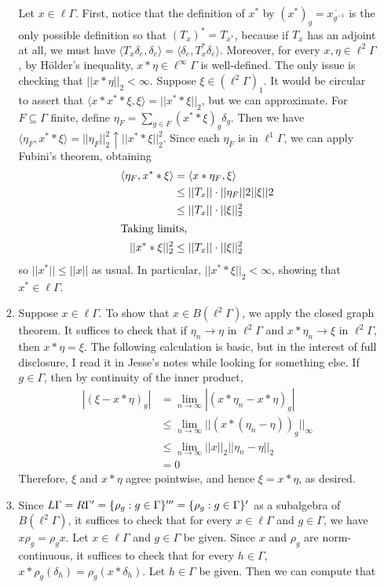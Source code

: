 \documentclass[a4paper,10pt]{report}
\newcommand{\ggen}[1]{\langle#1\rangle}
\newcommand{\pn}[2]{||#1||_{#2}}
\newcommand{\norm}[1]{||#1||}
\DeclarePairedDelimiter{\set}{\{}{\}}
\newcommand{\ol}[1]{\overline{#1}}
\begin{document}
\begin{enumerate}
\begin{enumerate}
				Let $x\in\ell\Gamma$. First, notice that the definition of $x^*$ by $(x^*)_g=\ol{x_{g^{-1}}}$ is the only possible definition so that $(T_x)^*=T_{x^*}$, because if $T_x$ has an adjoint at all, we must have $\ggen{T_x\delta_e,\delta_e}=\ggen{\delta_e,T_x^*\delta_e}$. Moreover, for every $x,\eta\in\ell^2\Gamma$, by {H\"{o}lder's} inequality, $x\ast\eta\in\ell^\infty\Gamma$ is well-defined. The only issue is checking that $\pn{x\ast\eta}{2}<\infty$. Suppose $\xi\in(\ell^2\Gamma)_1$. %
				It would be circular to assert that $\ggen{x\ast x^*\ast\xi,\xi}=\pn{x^*\ast\xi}{2}$, but we can approximate. For $F\subseteq\Gamma$ finite, define $\eta_F=\sum_{g\in F}(x^*\ast\xi)_g\delta_g$. Then we have $\ggen{\eta_F,x^*\ast\xi}=\pn{\eta_F}{2}^2\uparrow\pn{x^*\ast\xi}{2}^2$. Since each $\eta_F$ is in $\ell^1\Gamma$, we can apply Fubini's theorem, obtaining 
				\begin{align*}
					\ggen{\eta_F,x^*\ast\xi} &= \ggen{x\ast\eta_F,\xi}\\
					&\le \norm{T_x}\cdot\norm{\eta_F}{2}\norm{\xi}{2}\\
					&\le \norm{T_x}\cdot\pn{\xi}{2}^2\\
					\intertext{Taking limits, }
					\pn{x^*\ast\xi}{2}^2 &\le \norm{T_x}\cdot\pn{\xi}{2}^2
				\end{align*}
				so $\norm{x^*}\le\norm{x}$ as usual. In particular, $\pn{x^*\ast\xi}{2}<\infty$, showing that $x^*\in\ell\Gamma$. 
			\item Suppose $x\in\ell\Gamma$. To show that $x\in B(\ell^2\Gamma)$, we apply the closed graph theorem. It suffices to check that if $\eta_n\to\eta$ in $\ell^2\Gamma$ and $x\ast\eta_n\to\xi$ in $\ell^2\Gamma$, then $x\ast\eta=\xi$. The following calculation is basic, but in the interest of full disclosure, I read it in Jesse's notes while looking for something else. If $g\in\Gamma$, then by continuity of the inner product, 
				\begin{align*}
					|(\xi-x\ast\eta)_g| &= \lim_{n\to\infty}|(x\ast\eta_n-x\ast\eta)_g|\\
					&\le \lim_{n\to\infty}\pn{(x\ast(\eta_n-\eta))_g}{\infty}\\
					&\le \lim_{n\to\infty}\pn{x}{2}\pn{\eta_n-\eta}{2}\\
					&= 0
				\end{align*}
				Therefore, $\xi$ and $x\ast\eta$ agree pointwise, and hence $\xi=x\ast\eta$, as desired. 
			\item Since $L\Gamma=R\Gamma'=\set{\rho_g:g\in\Gamma}'''=\set{\rho_g:g\in\Gamma}'$ as a subalgebra of $B(\ell^2\Gamma)$, it suffices to check that for every $x\in\ell\Gamma$ and $g\in\Gamma$, we have $x\rho_g=\rho_gx$. Let $x\in\ell\Gamma$ and $g\in\Gamma$ be given. Since $x$ and $\rho_g$ are norm-continuous, it suffices to check that for every $h\in\Gamma$, $x\ast\rho_g(\delta_h)=\rho_g(x\ast\delta_h)$. Let $h\in\Gamma$ be given. Then we can compute that 

\end{enumerate}
\end{enumerate}
\end{document}

